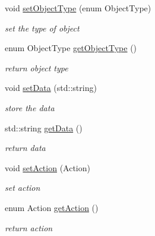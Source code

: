 \begin{DoxyCompactItemize}
void \mbox{\hyperlink{class_data_update_a5441cb945510c8a71facb3989c459842}{set\+Object\+Type}} (enum Object\+Type)
\begin{DoxyCompactList}\small\item\em set the type of object \end{DoxyCompactList}\item 
\mbox{\label{class_data_update_af59d8c7712756675e992b6d93b53b0ec}} 
enum Object\+Type \mbox{\hyperlink{class_data_update_af59d8c7712756675e992b6d93b53b0ec}{get\+Object\+Type}} ()
\begin{DoxyCompactList}\small\item\em return object type \end{DoxyCompactList}\item 
\mbox{\label{class_data_update_ab0ba2583933c1ca2fd9271b240e4bd4e}} 
void \mbox{\hyperlink{class_data_update_ab0ba2583933c1ca2fd9271b240e4bd4e}{set\+Data}} (std\+::string)
\begin{DoxyCompactList}\small\item\em store the data \end{DoxyCompactList}\item 
\mbox{\label{class_data_update_ad2481de3854a28cb2290c86b682b8adf}} 
std\+::string \mbox{\hyperlink{class_data_update_ad2481de3854a28cb2290c86b682b8adf}{get\+Data}} ()
\begin{DoxyCompactList}\small\item\em return data \end{DoxyCompactList}\item 
\mbox{\label{class_data_update_abe7f28a7d9be0d7d02844f9672fc85d1}} 
void \mbox{\hyperlink{class_data_update_abe7f28a7d9be0d7d02844f9672fc85d1}{set\+Action}} (Action)
\begin{DoxyCompactList}\small\item\em set action \end{DoxyCompactList}\item 
\mbox{\label{class_data_update_ab59ef0377c44b3a04ac3851da1214431}} 
enum Action \mbox{\hyperlink{class_data_update_ab59ef0377c44b3a04ac3851da1214431}{get\+Action}} ()
\begin{DoxyCompactList}\small\item\em return action \end{DoxyCompactList}\end{DoxyCompactItemize}


